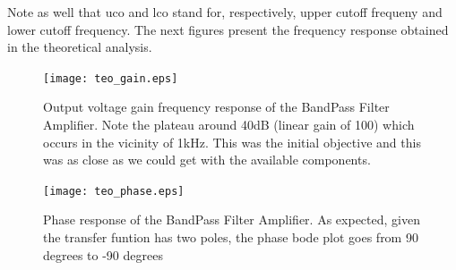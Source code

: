   Note as well that uco and lco stand for, respectively, upper cutoff frequeny and lower cutoff frequency.
  The next figures present the frequency response obtained in the theoretical analysis.


\begin{figure}[H] \centering
\texttt{[image: teo\_gain.eps]}
\caption{Output voltage gain frequency response of the BandPass Filter Amplifier. Note the plateau around 40dB (linear gain of 100) which occurs in the vicinity of 1kHz. This was the initial objective and this was as close as we could get with the available components.}
\label{fig:gain_octa}
\end{figure}

\begin{figure}[H] \centering
\texttt{[image: teo\_phase.eps]}
\caption{Phase response of the BandPass Filter Amplifier. As expected, given the transfer funtion has two poles, the phase bode plot goes from 90 degrees to -90 degrees}
\label{fig:phase_octa}
\end{figure}



\pagebreak


